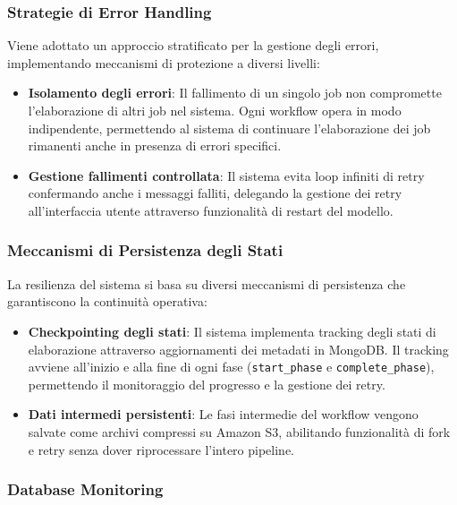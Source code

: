 \subsubsection{Strategie di Error Handling}

Viene adottato un approccio stratificato per la gestione degli errori, implementando meccanismi di protezione a diversi livelli:

\begin{itemize}
	\item \textbf{Isolamento degli errori}: Il fallimento di un singolo job non compromette l'elaborazione di altri job nel sistema. Ogni workflow opera in modo indipendente, permettendo al sistema di continuare l'elaborazione dei job rimanenti anche in presenza di errori specifici.
	
	\item \textbf{Gestione fallimenti controllata}: Il sistema evita loop infiniti di retry confermando anche i messaggi falliti, delegando la gestione dei retry all'interfaccia utente attraverso funzionalità di restart del modello.
\end{itemize}

\subsubsection{Meccanismi di Persistenza degli Stati}

La resilienza del sistema si basa su diversi meccanismi di persistenza che garantiscono la continuità operativa:

\begin{itemize}
	\item \textbf{Checkpointing degli stati}: Il sistema implementa tracking degli stati di elaborazione attraverso aggiornamenti dei metadati in MongoDB. Il tracking avviene all'inizio e alla fine di ogni fase (\texttt{start\_phase} e \texttt{complete\_phase}), permettendo il monitoraggio del progresso e la gestione dei retry.
	
	\item \textbf{Dati intermedi persistenti}: Le fasi intermedie del workflow vengono salvate come archivi compressi su Amazon S3, abilitando funzionalità di fork e retry senza dover riprocessare l'intero pipeline.
\end{itemize}

\subsubsection{Database Monitoring}

